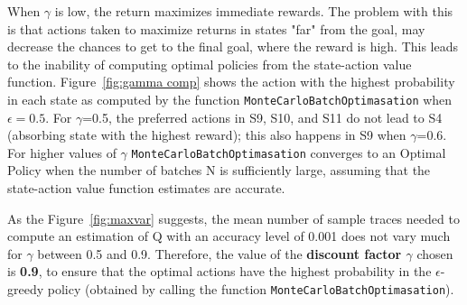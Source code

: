 \documentclass[11pt]{article}   	%
\begin{document}
When $\gamma$ is low, the return maximizes immediate rewards. The problem with this is that actions taken to maximize returns in states "far" from the goal, may decrease the chances to get to the final goal, where the reward is high. This leads to the inability of computing optimal policies from the state-action value function. Figure~\ref{fig:gamma comp} shows the action with the highest probability in each state as computed by the function \texttt{MonteCarloBatchOptimasation} when $\epsilon=0.5$. For $\gamma$=0.5, the preferred actions in S9, S10, and S11 do not lead to S4 (absorbing state with the highest reward); this also happens in S9 when $\gamma$=0.6. For higher values of $\gamma$ \texttt{MonteCarloBatchOptimasation} converges to an Optimal Policy when the number of batches N is sufficiently large, assuming that the state-action value function estimates are accurate.

As the Figure~\ref{fig:maxvar} suggests, the mean number of sample traces needed to compute an estimation of Q with an accuracy level of 0.001 does not vary much for $\gamma$ between 0.5 and 0.9. Therefore, the value of the \textbf{discount factor $\gamma$} chosen is \textbf{0.9}, to ensure that the optimal actions have the highest probability in the $\epsilon$-greedy policy (obtained by calling the function \texttt{MonteCarloBatchOptimasation}).
\end{document}
